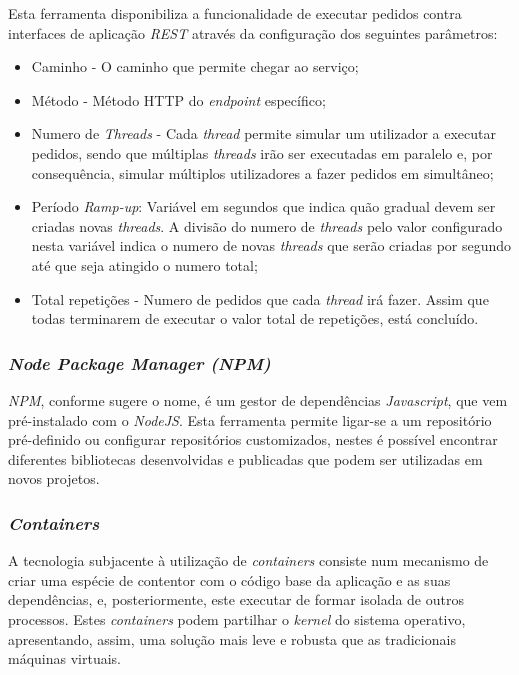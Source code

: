 Esta ferramenta disponibiliza a funcionalidade de executar pedidos contra interfaces de aplicação \emph{\acrshort{REST}} através da configuração dos seguintes parâmetros\cite{jmeter}:
\begin{itemize}
    \item Caminho - O caminho que permite chegar ao serviço;
    \item Método - Método HTTP do \emph{endpoint} específico;
    \item Numero de \emph{Threads} - Cada \emph{thread} permite simular um utilizador a executar pedidos, sendo que múltiplas \emph{threads} irão ser executadas em paralelo e, por consequência, simular múltiplos utilizadores a fazer pedidos em simultâneo;
    \item Período \emph{Ramp-up}: Variável em segundos que indica quão gradual devem ser criadas novas \emph{threads}. A divisão do numero de \emph{threads} pelo valor configurado nesta variável indica o numero de novas \emph{threads} que serão criadas por segundo até que seja atingido o numero total;
    \item Total repetições - Numero de pedidos que cada \emph{thread} irá fazer. Assim que todas terminarem de executar o valor total de repetições, está concluído.
\end{itemize}

\subsubsection{\emph{Node Package Manager (NPM) \label{sym:npm}}\label{estado_arte_npm}}
\emph{NPM}, conforme sugere o nome, é um gestor de dependências \emph{Javascript}, que vem pré-instalado com o \emph{NodeJS}.
Esta ferramenta permite ligar-se a um repositório pré-definido ou configurar repositórios customizados, nestes é possível encontrar diferentes bibliotecas desenvolvidas e publicadas que podem ser utilizadas em novos projetos\cite{npm_explanation}.

\subsubsection{\emph{Containers} \label{estado_arte_containers}}
A tecnologia subjacente à utilização de \emph{containers} consiste num mecanismo de criar uma espécie de contentor com o código base da aplicação e as suas dependências, e, posteriormente, este executar de formar isolada de outros processos.
Estes \emph{containers} podem partilhar o \emph{kernel} do sistema operativo, apresentando, assim, uma solução mais leve e robusta que as tradicionais máquinas virtuais\cite{techradar_containers}.






